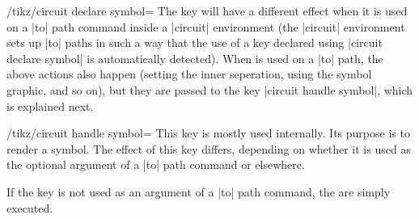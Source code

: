\begin{key}{/tikz/circuit declare symbol=}
  The key  will have a different effect when it is used on
  a |to| path command inside a |circuit| environment (the |circuit|
  environment sets up |to| paths in such a way that the use of a key
  declared using |circuit declare symbol| is automatically detected).
  When  is used on a |to| path, the above actions also
  happen (setting the inner seperation, using the symbol graphic, and
  so on), but they are passed to the key |circuit handle symbol|,
  which is explained next.
\end{key}


\begin{key}{/tikz/circuit handle symbol=}
  This key is mostly used internally. Its purpose is to render a
  symbol. The effect of this key differs, depending on whether it is
  used as the optional argument of a |to| path command or elsewhere.

  If the key is not used as an argument of a |to| path command, the
   are simply executed.


\end{key}
